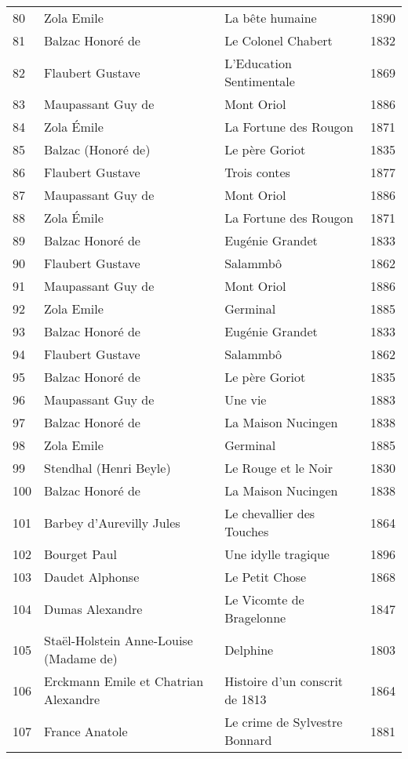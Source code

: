 \begin{center}
\begin{small}
\begin{longtable}{l l l l}
  80 & Zola Emile & La bête humaine & 1890 \\
  81 & Balzac Honoré de & Le Colonel Chabert & 1832 \\
  82 & Flaubert Gustave & L'Education Sentimentale & 1869 \\
  83 & Maupassant Guy de & Mont Oriol & 1886 \\
  84 & Zola Émile & La Fortune des Rougon & 1871 \\
  85 & Balzac (Honoré de) & Le père Goriot & 1835 \\
  86 & Flaubert Gustave & Trois contes & 1877 \\
  87 & Maupassant Guy de & Mont Oriol & 1886 \\
  88 & Zola Émile & La Fortune des Rougon & 1871 \\
  89 & Balzac Honoré de & Eugénie Grandet & 1833 \\
  90 & Flaubert Gustave & Salammbô & 1862 \\
  91 & Maupassant Guy de & Mont Oriol & 1886 \\
  92 & Zola Emile & Germinal & 1885 \\
  93 & Balzac Honoré de & Eugénie Grandet & 1833 \\
  94 & Flaubert Gustave & Salammbô & 1862 \\
  95 & Balzac Honoré de & Le père Goriot & 1835 \\
  96 & Maupassant Guy de & Une vie & 1883 \\
  97 & Balzac Honoré de & La Maison Nucingen & 1838 \\
  98 & Zola Emile & Germinal & 1885 \\
  99 & Stendhal (Henri Beyle) & Le Rouge et le Noir & 1830 \\
  100 & Balzac Honoré de & La Maison Nucingen & 1838 \\
  \midrule
  101 & Barbey d'Aurevilly Jules & Le chevallier des Touches & 1864 \\
  102 & Bourget Paul & Une idylle tragique & 1896 \\
  103 & Daudet Alphonse & Le Petit Chose & 1868 \\
  104 & Dumas Alexandre & Le Vicomte de Bragelonne & 1847 \\
  105 & Staël-Holstein Anne-Louise (Madame de) & Delphine & 1803 \\
  106 & Erckmann Emile et Chatrian Alexandre & Histoire d’un conscrit de 1813 & 1864 \\
  107 & France Anatole & Le crime de Sylvestre Bonnard & 1881 \\

\end{longtable}
\end{small}
\end{center}
